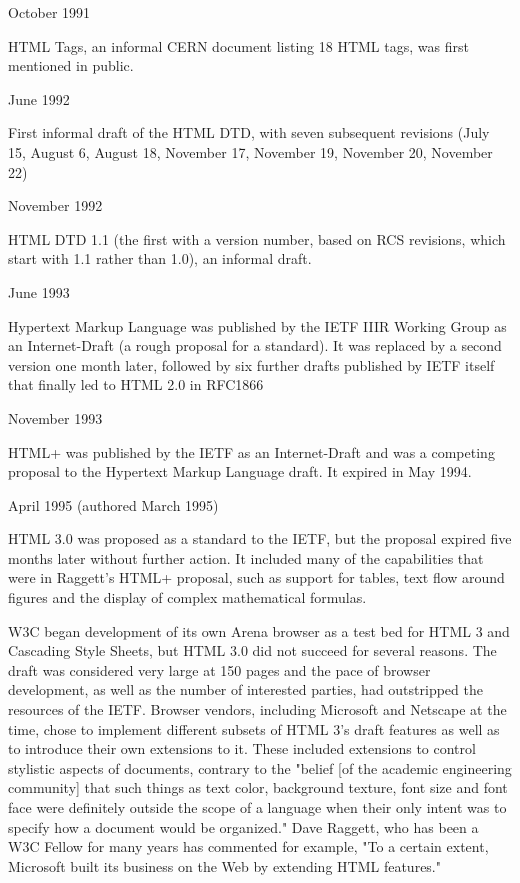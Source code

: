 \begin{compactitem}
\item October 1991

HTML Tags, an informal CERN document listing 18 HTML tags, was first mentioned in public.

\item June 1992

First informal draft of the HTML DTD, with seven subsequent revisions (July 15, August 6, August 18, November 17, November 19, November 20, November 22)

\item November 1992

HTML DTD 1.1 (the first with a version number, based on RCS revisions, which start with 1.1 rather than 1.0), an informal draft.

\item June 1993

Hypertext Markup Language was published by the IETF IIIR Working Group as an Internet-Draft (a rough proposal for a standard). It was replaced by a second version one month later, followed by six further drafts published by IETF itself that finally led to HTML 2.0 in RFC1866

\item November 1993

HTML+ was published by the IETF as an Internet-Draft and was a competing proposal to the Hypertext Markup Language draft. It expired in May 1994.

\item April 1995 (authored March 1995)

HTML 3.0 was proposed as a standard to the IETF, but the proposal expired five months later without further action. It included many of the capabilities that were in Raggett's HTML+ proposal, such as support for tables, text flow around figures and the display of complex mathematical formulas.

W3C began development of its own Arena browser as a test bed for HTML 3 and Cascading Style Sheets, but HTML 3.0 did not succeed for several reasons. The draft was considered very large at 150 pages and the pace of browser development, as well as the number of interested parties, had outstripped the resources of the IETF. Browser vendors, including Microsoft and Netscape at the time, chose to implement different subsets of HTML 3's draft features as well as to introduce their own extensions to it. These included extensions to control stylistic aspects of documents, contrary to the "belief [of the academic engineering community] that such things as text color, background texture, font size and font face were definitely outside the scope of a language when their only intent was to specify how a document would be organized." Dave Raggett, who has been a W3C Fellow for many years has commented for example, "To a certain extent, Microsoft built its business on the Web by extending HTML features."


\end{compactitem}
